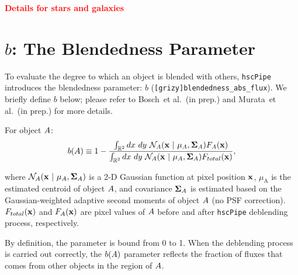 \documentclass[useamsfonts]{pasj01}
\def\etal{{\ et al.~}}
\def\hscpipe{\texttt{hscPipe}}
\newcommand{\todo}[1]{\textcolor{red} {\textbf{#1}}}
\begin{document}
    \todo{Details for stars and galaxies}


\section{$b$: The Blendedness Parameter}
    \label{app:defineb}

    To evaluate the degree to which an object is blended with others, \hscpipe{} introduces
    the blendedness parameter: $b$ (\texttt{[grizy]blendedness\_abs\_flux}).
    We briefly define  $b$ below; please refer to Bosch\etal (in prep.) and Murata\etal (in prep.) for more details.

    For object ${\rm A}$:
    \begin{eqnarray*}
        b({\rm A}) \equiv
        1-\frac{\int_{\mathbb{R}^2} {\rm d}x~ {\rm d}y\ \mathcal{N}_{\mathrm{A}}({\bf x}\ |\  \mu_{\mathrm{A}}, {\bf\Sigma}_{\mathrm{A}})
        F_{\mathrm{A}}({\bf x})}{\int_{\mathbb{R}^2} {\rm d}x~ {\rm d}y\ \mathcal{N}_{\mathrm{A}}({\bf x}\ |\  \mu_{\mathrm{A}},
        {\bf\Sigma}_{\rm{A}}) F_{\rm{total}}({\bf x})},
        \label{eq:defineb}
    \end{eqnarray*}

    \noindent
    where $\mathcal{N}_{\rm{A}}({ \bf x }\ |\  \mu_{\rm{A}}, {\bf\Sigma}_{\rm{A}})$
    is a 2-D Gaussian function at pixel position $\bf x$, $\mu_{\mathrm{A}}$ is the
    estimated centroid of object ${\rm A}$, and covariance ${\bf \Sigma}_{\mathrm{A}}$
    is estimated based on the Gaussian-weighted adaptive second moments of object
    ${\rm A}$ (no PSF correction).
    $F_{\mathrm{total}}({\bf x })$ and $F_{\rm{A}}({\bf x })$ are pixel values of
    ${\rm A}$ before and after \hscpipe{} deblending process, respectively.

    By definition, the parameter is bound from 0 to 1.
    When the deblending process is carried out correctly, the $b({\rm A})$ parameter
    reflects the fraction of fluxes that comes from other objects in the
    region of ${\rm A}$.

%

\label{lastpage}
\end{document}
